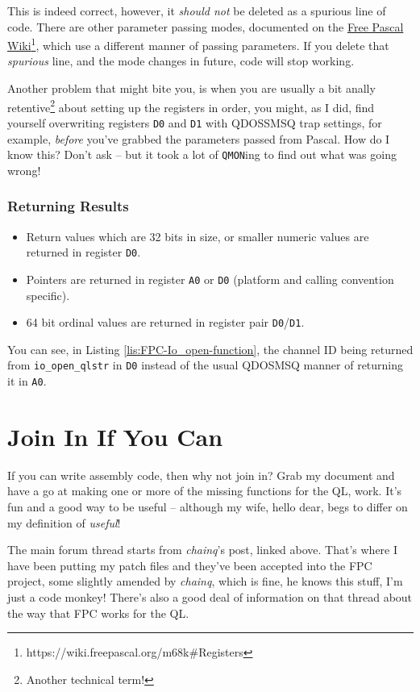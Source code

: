 This is indeed correct, however, it \emph{should not} be deleted as
a spurious line of code. There are other parameter passing modes,
documented on the \href{https://wiki.freepascal.org/m68k\#Registers}{Free Pascal Wiki}\footnote{https://wiki.freepascal.org/m68k\#Registers},
which use a different manner of passing parameters. If you delete
that \emph{spurious} line, and the mode changes in future, code will
stop working.

Another problem that might bite you, is when you are usually a bit
anally retentive\footnote{Another technical term!} about setting
up the registers in order, you might, as I did, find yourself overwriting
registers \texttt{D0} and \texttt{D1} with QDOSSMSQ trap settings,
for example, \emph{before} you've grabbed the parameters passed from
Pascal. How do I know this? Don't ask -- but it took a lot of \texttt{QMON}ing
to find out what was going wrong!

\subsubsection{Returning Results}
\begin{itemize}
\item Return values which are 32 bits in size, or smaller numeric values
are returned in register \texttt{D0}.
\item Pointers are returned in register \texttt{A0} or \texttt{D0} (platform
and calling convention specific).
\item 64 bit ordinal values are returned in register pair \texttt{D0}/\texttt{D1}.
\end{itemize}
You can see, in Listing \ref{lis:FPC-Io_open-function}, the channel
ID being returned from \texttt{io\_open\_qlstr} in \texttt{D0} instead
of the usual QDOSMSQ manner of returning it in \texttt{A0}.

\section{Join In If You Can}

If you can write assembly code, then why not join in? Grab my document
and have a go at making one or more of the missing functions for the
QL, work. It's fun and a good way to be useful -- although my wife,
hello dear, begs to differ on my definition of \emph{useful}!

The main forum thread starts from \emph{chainq}'s post, linked above.
That's where I have been putting my patch files and they've been accepted
into the FPC project, some slightly amended by \emph{chainq}, which
is fine, he knows this stuff, I'm just a code monkey! There's also
a good deal of information on that thread about the way that FPC works
for the QL.

